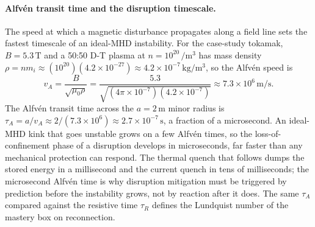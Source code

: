 \paragraph{Alfv\'en transit time and the disruption timescale.}
The speed at which a magnetic disturbance propagates along a field line sets
the fastest timescale of an ideal-MHD instability. For the case-study
tokamak, $B = 5.3\,\si{\tesla}$ and a 50:50 D-T plasma at $n = 10^{20}\,\si{
\per\meter\cubed}$ has mass density $\rho = n m_{i} \approx (10^{20})(4.2
\times 10^{-27}) \approx 4.2\times 10^{-7}\,\si{\kilogram\per\meter\cubed}$,
so the Alfv\'en speed is
\[
v_{A} = \frac{B}{\sqrt{\mu_{0}\rho}}
= \frac{5.3}{\sqrt{(4\pi\times 10^{-7})(4.2\times 10^{-7})}}
\approx 7.3\times 10^{6}\,\si{\meter\per\second}.
\]
The Alfv\'en transit time across the $a = 2\,\si{\meter}$ minor radius is
$\tau_{A} = a/v_{A} \approx 2/(7.3\times 10^{6}) \approx 2.7\times 10^{-7}\,
\si{\second}$, a fraction of a microsecond. An ideal-MHD kink that goes
unstable grows on a few Alfv\'en times, so the loss-of-confinement phase of
a disruption develops in microseconds, far faster than any mechanical
protection can respond. The thermal quench that follows dumps the stored
energy in a millisecond and the current quench in tens of milliseconds; the
microsecond Alfv\'en time is why disruption mitigation must be triggered by
prediction before the instability grows, not by reaction after it does. The
same $\tau_{A}$ compared against the resistive time $\tau_{R}$ defines the
Lundquist number of the mastery box on reconnection.

